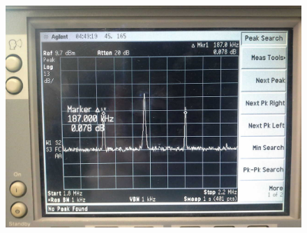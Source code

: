 
\FloatBarrier\begin{figure}[!h]
\centering
\includegraphics[scale=1]{../Grafiken/Frequenzspektrum_c_AmpModuliertTraeger.jpg}
\caption{\label{fig:frequenzspektrum_c_ampmodulierttraeger}}
\end{figure}
\FloatBarrier